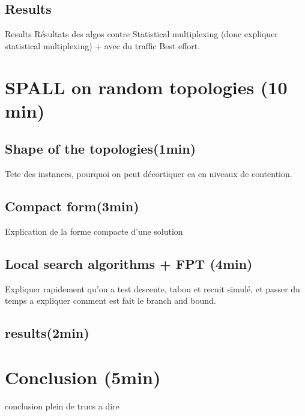 \documentclass[10 pt]{beamer}
\begin{document}
\subsection{Results}
\begin{frame}{Results}
Résultats des algos contre Statistical multiplexing (donc expliquer statistical multiplexing) + avec du traffic Best effort.
\end{frame}

\section{SPALL on random topologies (10 min)}
\subsection{Shape of the topologies(1min)}
\begin{frame}
Tete des instances, pourquoi on peut décortiquer ca en niveaux de contention.
\end{frame}
\subsection{Compact form(3min)}
\begin{frame}
Explication de la forme compacte d'une solution
\end{frame}
\subsection{Local search algorithms + FPT (4min)}
\begin{frame}
Expliquer rapidement qu'on a test descente, tabou et recuit simulé, et passer du temps a expliquer comment est fait le branch and bound.
\end{frame}
\subsection{results(2min)}
\section{Conclusion (5min)}
\begin{frame}{conclusion}
plein de trucs a dire
\end{frame}
\end{document}
